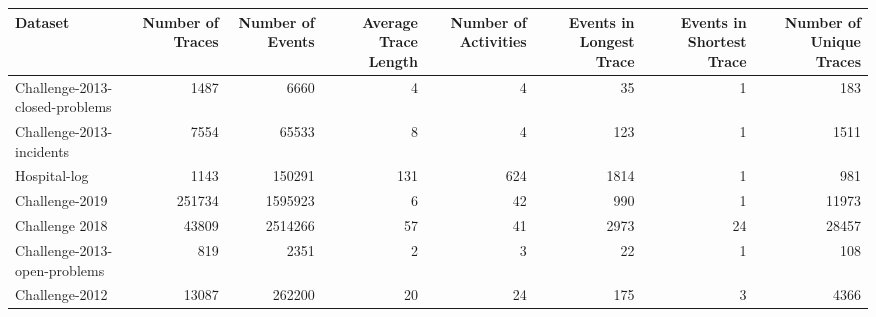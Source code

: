 \begin{tabular}{lrrrrrrr}
\toprule
Dataset & Number of Traces & Number of Events & Average Trace Length & Number of Activities & Events in Longest Trace & Events in Shortest Trace & Number of Unique Traces \\
\midrule
Challenge-2013-closed-problems & 1487 & 6660 & 4 & 4 & 35 & 1 & 183 \\
Challenge-2013-incidents & 7554 & 65533 & 8 & 4 & 123 & 1 & 1511 \\
Hospital-log & 1143 & 150291 & 131 & 624 & 1814 & 1 & 981 \\
Challenge-2019 & 251734 & 1595923 & 6 & 42 & 990 & 1 & 11973 \\
Challenge 2018 & 43809 & 2514266 & 57 & 41 & 2973 & 24 & 28457 \\
Challenge-2013-open-problems & 819 & 2351 & 2 & 3 & 22 & 1 & 108 \\
Challenge-2012 & 13087 & 262200 & 20 & 24 & 175 & 3 & 4366 \\
\bottomrule
\end{tabular}
